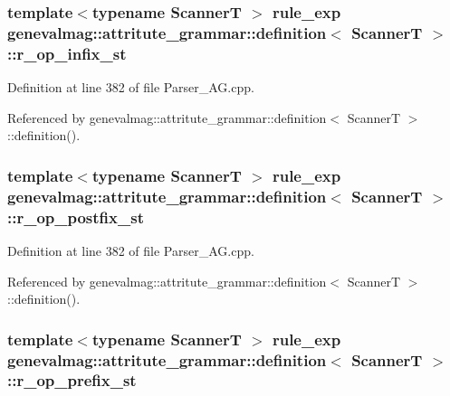 \hypertarget{structgenevalmag_1_1attritute__grammar_1_1definition_a19be6f1c2a2cd3ff25f83795fc7bf349}{
\subsubsection[{r\_\-op\_\-infix\_\-st}]{\setlength{\rightskip}{0pt plus 5cm}template$<$typename ScannerT $>$ {\bf rule\_\-exp} {\bf genevalmag::attritute\_\-grammar::definition}$<$ ScannerT $>$::{\bf r\_\-op\_\-infix\_\-st}}}
\label{structgenevalmag_1_1attritute__grammar_1_1definition_a19be6f1c2a2cd3ff25f83795fc7bf349}


Definition at line 382 of file Parser\_\-AG.cpp.



Referenced by genevalmag::attritute\_\-grammar::definition$<$ ScannerT $>$::definition().

\hypertarget{structgenevalmag_1_1attritute__grammar_1_1definition_a991947011b04988e682ecb1a28fe5551}{
\subsubsection[{r\_\-op\_\-postfix\_\-st}]{\setlength{\rightskip}{0pt plus 5cm}template$<$typename ScannerT $>$ {\bf rule\_\-exp} {\bf genevalmag::attritute\_\-grammar::definition}$<$ ScannerT $>$::{\bf r\_\-op\_\-postfix\_\-st}}}
\label{structgenevalmag_1_1attritute__grammar_1_1definition_a991947011b04988e682ecb1a28fe5551}


Definition at line 382 of file Parser\_\-AG.cpp.



Referenced by genevalmag::attritute\_\-grammar::definition$<$ ScannerT $>$::definition().

\hypertarget{structgenevalmag_1_1attritute__grammar_1_1definition_a2233f17bc87358652ad803f71327abd2}{
\subsubsection[{r\_\-op\_\-prefix\_\-st}]{\setlength{\rightskip}{0pt plus 5cm}template$<$typename ScannerT $>$ {\bf rule\_\-exp} {\bf genevalmag::attritute\_\-grammar::definition}$<$ ScannerT $>$::{\bf r\_\-op\_\-prefix\_\-st}}}
\label{structgenevalmag_1_1attritute__grammar_1_1definition_a2233f17bc87358652ad803f71327abd2}


